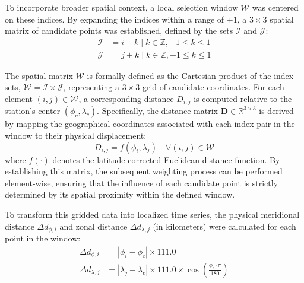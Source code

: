 \documentclass[conference]{IEEEtran}
\begin{document}
		To incorporate broader spatial context, a local selection window $\mathcal{W}$ was centered on these indices. By expanding the indices within a range of $\pm 1$, a $3\times3$ spatial matrix of candidate points was established, defined by the sets $\mathcal{I}$ and $\mathcal{J}$:
		\begin{equation*}
			\begin{split}
				\mathcal{I} &= { i+k \mid k \in \mathbb{Z}, -1 \leq k \leq 1 } \\
				\mathcal{J} &= { j+k \mid k \in \mathbb{Z}, -1 \leq k \leq 1 }
			\end{split}
		\end{equation*}
		
		The spatial matrix $\mathcal{W}$ is formally defined as the Cartesian product of the index sets, $\mathcal{W} = \mathcal{I} \times \mathcal{J}$, representing a $3 \times 3$ grid of candidate coordinates. For each element $(i, j) \in \mathcal{W}$, a corresponding distance $D_{i,j}$ is computed relative to the station's center $(\phi_c, \lambda_c)$. Specifically, the distance matrix $\mathbf{D} \in \mathbb{R}^{3 \times 3}$ is derived by mapping the geographical coordinates associated with each index pair in the window to their physical displacement:
		\begin{equation*}
			D_{i,j} = f(\phi_i, \lambda_j) \quad \forall (i, j) \in \mathcal{W}
		\end{equation*}
		where $f(\cdot)$ denotes the latitude-corrected Euclidean distance function. By establishing this matrix, the subsequent weighting process can be performed element-wise, ensuring that the influence of each candidate point is strictly determined by its spatial proximity within the defined window.
		
		To transform this gridded data into localized time series, the physical meridional distance $\Delta d_{\phi, i}$ and zonal distance $\Delta d_{\lambda, j}$ (in kilometers) were calculated for each point in the window:
		\begin{equation*}
			\begin{split}
				\Delta d_{\phi, i} &= |\phi_i - \phi_{c}| \times 111.0 \\
				\Delta d_{\lambda, j} &= |\lambda_j - \lambda_{c}| \times 111.0 \times \cos\left(\frac{\phi_i \cdot \pi}{180}\right)
			\end{split}
		\end{equation*}
		
\end{document}

